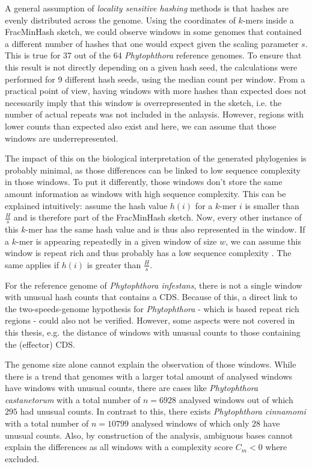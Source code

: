 A general assumption of \textit{locality sensitive hashing} methods is that
hashes are evenly distributed across the genome. Using the coordinates of
$k$-mers inside a FracMinHash sketch, we could observe windows in some genomes
that contained a different number of hashes that one would expect given the
scaling parameter $s$. This is true for 37 out of the 64 \textit{Phytophthora}
reference genomes. To ensure that this result is not directly depending on a
given hash seed, the calculations were performed for 9 different hash seeds,
using the median count per window. From a practical point of view, having
windows with more hashes than expected does not necessarily imply that this
window is overrepresented in the sketch, i.e. the number of actual repeats was
not included in the anlaysis. However, regions with lower counts than expected
also exist and here, we can assume that those windows are underrepresented.

The impact of this on the biological interpretation of the generated phylogenies
is probably minimal, as those differences can be linked to low sequence
complexity in those windows. To put it differently, those windows don't store
the same amount information as windows with high sequence complexity. This can
be explained intuitively: assume the hash value $h(i)$ for a $k$-mer $i$ is
smaller than $\frac{H}{s}$ and is therefore part of the FracMinHash sketch. Now,
every other instance of this $k$-mer has the same hash value and is thus also
represented in the window. If a $k$-mer is appearing repeatedly in a given
window of size $w$, we can assume this window is repeat rich and thus probably
has a low sequence complexity \cite{pirogovHighcomplexityRegionsMammalian2019}.
The same applies if $h(i)$ is greater than $\frac{H}{s}$.

For the reference genome of \textit{Phytophthora infestans}, there is not a
single window with unusual hash counts that contains a CDS. Because of this, a
direct link to the two-speeds-genome hypothesis for \textit{Phytophthora} -
which is based repeat rich regions - could also not be verified. However, some
aspects were not covered in this thesis, e.g. the distance of windows with
unusual counts to those containing the (effector) CDS.

The genome size alone cannot explain the observation of those windows. While
there is a trend that genomes with a larger total amount of analysed windows
have windows with unusual counts, there are cases like \textit{Phytophthora
castanetorum} with a total number of $n=6928$ analysed windows out of which
$295$ had unusual counts. In contrast to this, there exists \textit{Phytophthora
cinnamomi} with a total number of $n=10799$ analysed windows of which only $28$
have unusual counts. Also, by construction of the analysis, ambiguous bases
cannot explain the differences as all windows with a complexity score $C_m < 0$
where excluded. 

